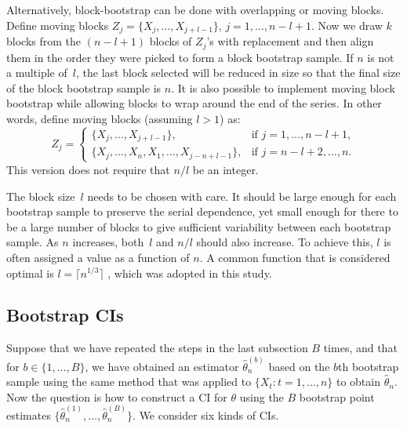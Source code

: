 \documentclass[12pt, letterpaper, titlepage]{article}
\begin{document}
Alternatively, block-bootstrap can be done with overlapping or moving blocks.
Define moving blocks $Z_j = \{X_j, \ldots, X_{j + l - 1}\}$,
$j = 1, \ldots, n - l + 1$. Now we draw $k$ blocks from the $(n - l + 1)$
blocks
of $Z_j$'s with replacement and then align them in the order they were
picked
to form a block bootstrap sample. If $n$ is not a multiple of~$l$, the last
block selected will be reduced in size so that the final size of the
block bootstrap sample is $n$. It is also possible to implement moving block
bootstrap while allowing blocks to wrap around the end of the series. In other
words, define moving blocks (assuming $l > 1$) as:
\begin{equation}
Z_j =
    \begin{cases}
        \{X_j, \ldots, X_{j + l - 1}\}, & \text{if } j = 1, \dots, n - l + 1,\\
        \{X_j, \ldots, X_n, X_1, \ldots, X_{j-n+l-1}\}, & \text{if } j = n - l
        + 2 ,\dots, n.
    \end{cases}
\end{equation}
This version does not require that $n/l$ be an integer.


The block size~$l$ needs to be chosen with care. It should be large enough for
each bootstrap sample to preserve the serial dependence, yet small enough for
there to be a large number of blocks to give sufficient variability between
each bootstrap sample. As $n$ increases, both~$l$
and $n / l$ should also increase. To achieve this, $l$ is
often assigned a value as a function of $n$. A common function that is
considered optimal is $l = \lceil n^{1/3} \rceil$
\citep{buhlmann1999block}, which was adopted in this study.


\subsection{Bootstrap CIs}


Suppose that we have repeated the steps in the last subsection $B$ times, and
that for $b \in \{1, \ldots, B\}$, we have obtained an estimator
$\hat\theta_n^{(b)}$ based on the $b$th bootstrap sample using the same
method
that was applied to $\{X_t: t = 1, \ldots, n\}$ to obtain $\hat\theta_n$.
Now the question is how to construct a CI for $\theta$
using the $B$ bootstrap point estimates
$\{\hat\theta_n^{(1)}, \ldots, \hat\theta_n^{(B)}\}$.
We consider six kinds of CIs.
\end{document}
